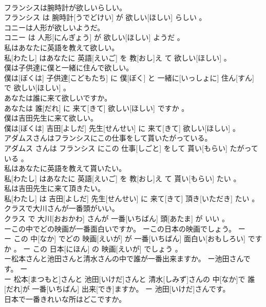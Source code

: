 \documentclass[8pt]{extreport}
\begin{document}
\begin{CJK}{UTF8}{min}
\\	フランシスは腕時計が欲しいらしい。	
\\	フランシス は 腕時計[うでどけい] が 欲しい[ほしい] らしい 。
\\	コニーは人形が欲しいようだ。	
\\	コニー は 人形[にんぎょう] が 欲しい[ほしい] ようだ 。
\\	私はあなたに英語を教えて欲しい。	
\\	私[わたし] はあなたに 英語[えいご] を 教[おし]え て 欲しい[ほしい] 。
\\	僕は子供達に僕と一緒に住んで欲しい。	
\\	僕は[ぼくは] 子供達[こどもたち] に 僕[ぼく] と 一緒に[いっしょに] 住ん[すん] で 欲しい[ほしい] 。
\\	あなたは誰に来て欲しいですか。	
\\	あなたは 誰[だれ] に 来て[きて] 欲しい[ほしい] ですか 。
\\	僕は吉田先生に来て欲しい。	
\\	僕は[ぼくは] 吉田[よしだ] 先生[せんせい] に 来て[きて] 欲しい[ほしい] 。
\\	アダムスさんはフランシスにこの仕事をして貰いたがっている。	
\\	アダムス さんは フランシス にこの 仕事[しごと] をして 貰い[もらい] たがっている 。
\\	私はあなたに英語を教えて貰いたい。	
\\	私[わたし] はあなたに 英語[えいご] を 教[おし]え て 貰い[もらい] たい 。
\\	私は吉田先生に来て頂きたい。	
\\	私[わたし] は 吉田[よしだ] 先生[せんせい] に 来て[きて] 頂き[いただき] たい 。
\\	クラスで大川さんが一番頭がいい。	
\\	クラス で 大川[おおかわ] さんが 一番[いちばん] 頭[あたま] が いい 。
\\	ーこの中でどの映画が一番面白いですか。 ーこの日本の映画でしょう。	ー
\\	ー この 中[なか] でどの 映画[えいが] が 一番[いちばん] 面白い[おもしろい] ですか 。 ー この 日本[にほん] の 映画[えいが] でしょう 。
\\	ー松本さんと池田さんと清水さんの中で誰が一番出来ますか。 ー池田さんです。	ー
\\	ー 松本[まつもと]さんと 池田[いけだ]さんと 清水[しみず]さんの 中[なか]で 誰[だれ]が 一番[いちばん] 出来[でき]ますか。 ー 池田[いけだ]さんです。
\\	日本で一番きれいな所はどこですか。	

\end{CJK}
\end{document}
